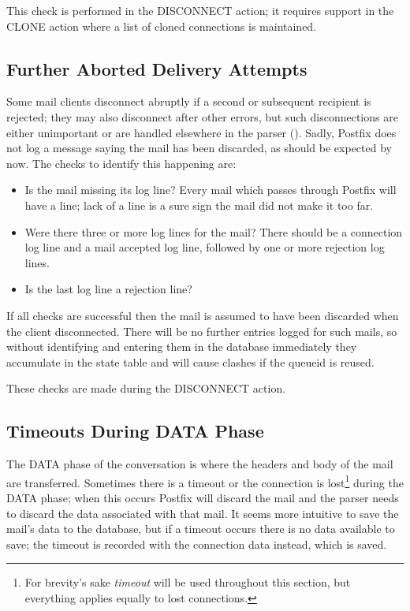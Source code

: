 This check is performed in the DISCONNECT action; it requires support in
the CLONE action where a list of cloned connections is maintained.


\subsection{Further Aborted Delivery Attempts}

Some mail clients disconnect abruptly if a second or subsequent recipient
is rejected; they may also disconnect after other errors, but such
disconnections are either unimportant or are handled elsewhere in the
parser ().  Sadly, Postfix does not
log a message saying the mail has been discarded, as should be expected by
now.  The checks to identify this happening are:

\begin{itemize}

    \item Is the mail missing its  log line?  Every mail
        which passes through Postfix will have a  line;
        lack of a  line is a sure sign the mail did not
        make it too far.

    \item Were there three or more  log lines for the mail?
        There should be a connection log line and a mail accepted log line,
        followed by one or more rejection log lines.

    \item Is the last  log line a rejection line?

\end{itemize}

If all checks are successful then the mail is assumed to have been
discarded when the client disconnected.  There will be no further entries
logged for such mails, so without identifying and entering them in the
database immediately they accumulate in the state table and will cause
clashes if the queueid is reused.

These checks are made during the DISCONNECT action.

\subsection{Timeouts During DATA Phase}

\label{timeouts during data phase}

The DATA phase of the  conversation is where the headers and
body of the mail are transferred.  Sometimes there is a timeout or the
connection is lost\footnote{For brevity's sake \textit{timeout\/} will be
used throughout this section, but everything applies equally to lost
connections.} during the DATA phase; when this occurs Postfix will discard
the mail and the parser needs to discard the data associated with that
mail.  It seems more intuitive to save the mail's data to the database, but
if a timeout occurs there is no data available to save; the timeout is
recorded with the connection data instead, which is saved.

